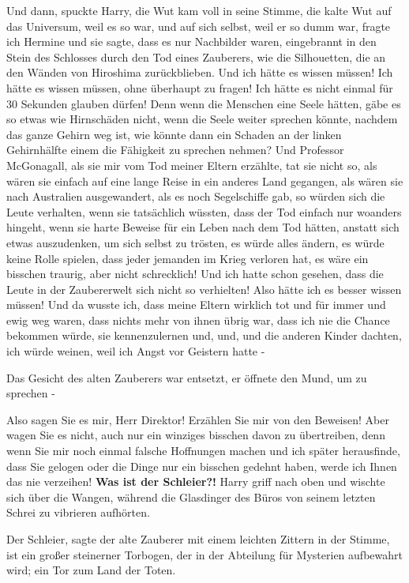 \glqq{}Und dann\grqq{}, spuckte Harry, die Wut kam voll in seine Stimme, die
kalte Wut auf das Universum, weil es so war, und auf sich selbst, weil er so
dumm war, \glqq{}fragte ich Hermine und sie sagte, dass es nur Nachbilder waren,
eingebrannt in den Stein des Schlosses durch den Tod eines Zauberers, wie die
Silhouetten, die an den Wänden von Hiroshima zurückblieben. Und ich hätte es
wissen müssen! Ich hätte es wissen müssen, ohne überhaupt zu fragen! Ich hätte
es nicht einmal für 30 Sekunden glauben dürfen! Denn wenn die Menschen eine
Seele hätten, gäbe es so etwas wie Hirnschäden nicht, wenn die Seele weiter
sprechen könnte, nachdem das ganze Gehirn weg ist, wie könnte dann ein Schaden
an der linken Gehirnhälfte einem die Fähigkeit zu sprechen nehmen? Und Professor
McGonagall, als sie mir vom Tod meiner Eltern erzählte, tat sie nicht so, als
wären sie einfach auf eine lange Reise in ein anderes Land gegangen, als wären
sie nach Australien ausgewandert, als es noch Segelschiffe gab, so würden sich
die Leute verhalten, wenn sie tatsächlich wüssten, dass der Tod einfach nur
woanders hingeht, wenn sie harte Beweise für ein Leben nach dem Tod hätten,
anstatt sich etwas auszudenken, um sich selbst zu trösten, es würde alles
ändern, es würde keine Rolle spielen, dass jeder jemanden im Krieg verloren hat,
es wäre ein bisschen traurig, aber nicht schrecklich! Und ich hatte schon
gesehen, dass die Leute in der Zaubererwelt sich nicht so verhielten! Also hätte
ich es besser wissen müssen! Und da wusste ich, dass meine Eltern wirklich tot
und für immer und ewig weg waren, dass nichts mehr von ihnen übrig war, dass ich
nie die Chance bekommen würde, sie kennenzulernen und, und, und die anderen
Kinder dachten, ich würde weinen, weil ich Angst vor Geistern hatte -\grqq{}

Das Gesicht des alten Zauberers war entsetzt, er öffnete den Mund, um zu
sprechen -

\glqq{}Also sagen Sie es mir, Herr Direktor! Erzählen Sie mir von den Beweisen!
Aber wagen Sie es nicht, auch nur ein winziges bisschen davon zu übertreiben,
denn wenn Sie mir noch einmal falsche Hoffnungen machen und ich später
herausfinde, dass Sie gelogen oder die Dinge nur ein bisschen gedehnt haben,
werde ich Ihnen das nie verzeihen! \textbf{Was ist der Schleier?!}\grqq{} Harry
griff nach oben und wischte sich über die Wangen, während die Glasdinger des
Büros von seinem letzten Schrei zu vibrieren aufhörten.

\glqq{}Der Schleier\grqq{}, sagte der alte Zauberer mit einem leichten Zittern in
der Stimme, \glqq{}ist ein großer steinerner Torbogen, der in der Abteilung für
Mysterien aufbewahrt wird; ein Tor zum Land der Toten.\grqq{}

